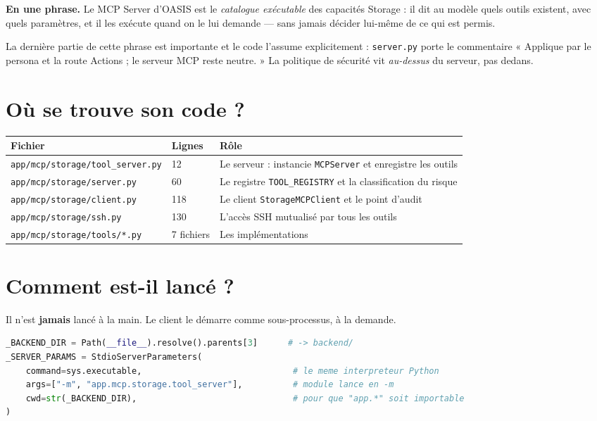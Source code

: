 \documentclass[11pt,a4paper]{report}
\newcommand{\file}[1]{\texttt{\small #1}}
\newcommand{\fn}[1]{\texttt{\small\textcolor{oasisviolet}{#1}}}
\newcommand{\cls}[1]{\texttt{\small\textcolor{oasisblue}{#1}}}
\begin{document}
\begin{keybox}
\textbf{En une phrase.} Le MCP Server d'OASIS est le \emph{catalogue exécutable}
des capacités Storage : il dit au modèle quels outils existent, avec quels
paramètres, et il les exécute quand on le lui demande --- sans jamais décider
lui-même de ce qui est permis.
\end{keybox}

\noindent
La dernière partie de cette phrase est importante et le code l'assume
explicitement : \file{server.py} porte le commentaire « Applique par le persona
et la route Actions ; le serveur MCP reste neutre. » La politique de sécurité
vit \emph{au-dessus} du serveur, pas dedans.

\section{Où se trouve son code ?}

\begin{longtable}{@{}p{4.6cm}p{2.0cm}p{7.8cm}@{}}
\toprule
\textbf{Fichier} & \textbf{Lignes} & \textbf{Rôle}\\
\midrule
\endhead
\file{app/mcp/storage/tool\_server.py} & 12 & Le serveur : instancie \cls{MCPServer} et enregistre les outils\\
\file{app/mcp/storage/server.py} & 60 & Le registre \fn{TOOL\_REGISTRY} et la classification du risque\\
\file{app/mcp/storage/client.py} & 118 & Le client \cls{StorageMCPClient} et le point d'audit\\
\file{app/mcp/storage/ssh.py} & 130 & L'accès SSH mutualisé par tous les outils\\
\file{app/mcp/storage/tools/*.py} & 7 fichiers & Les implémentations\\
\bottomrule
\end{longtable}

\section{Comment est-il lancé ?}

Il n'est \textbf{jamais} lancé à la main. Le client le démarre comme
sous-processus, à la demande.

\begin{lstlisting}[language=Python,caption={app/mcp/storage/client.py --- paramètres de lancement}]
_BACKEND_DIR = Path(__file__).resolve().parents[3]      # -> backend/
_SERVER_PARAMS = StdioServerParameters(
    command=sys.executable,                              # le meme interpreteur Python
    args=["-m", "app.mcp.storage.tool_server"],          # module lance en -m
    cwd=str(_BACKEND_DIR),                               # pour que "app.*" soit importable
)
\end{lstlisting}
\end{document}

